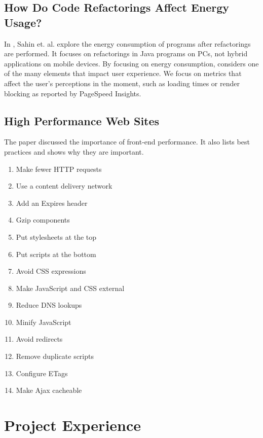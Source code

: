 \documentclass{acm_proc_article-sp}
\begin{document}
\subsection{How Do Code Refactorings Affect Energy Usage? \cite{Sahin:2014:CRA:2652524.2652538}}
In \cite{Sahin:2014:CRA:2652524.2652538}, Sahin et. al. explore the energy consumption of programs after refactorings are performed. 
It focuses on refactorings in Java programs on PCs, not hybrid applications on mobile devices. 
By focusing on energy consumption, \cite{Sahin:2014:CRA:2652524.2652538} considers one of the many elements that impact user experience. 
We focus on metrics that affect the user's perceptions in the moment, such as loading times or render blocking as reported by PageSpeed Insights.

\subsection{High Performance Web Sites\cite{souders2008high}}
The paper discussed the importance of front-end performance.
It also lists best practices and shows why they are important.
\vspace{-1.0em}
\begin{enumerate}\itemsep1pt \parskip0pt 
	\item Make fewer HTTP requests
	\item Use a content delivery network
	\item Add an Expires header
	\item Gzip components
	\item Put stylesheets at the top
	\item Put scripts at the bottom
	\item Avoid CSS expressions
	\item Make JavaScript and CSS external
	\item Reduce DNS lookups
	\item Minify JavaScript
	\item Avoid redirects
	\item Remove duplicate scripts
	\item Configure ETags
	\item Make Ajax cacheable
\end{enumerate}

\section{Project Experience}
\end{document}
